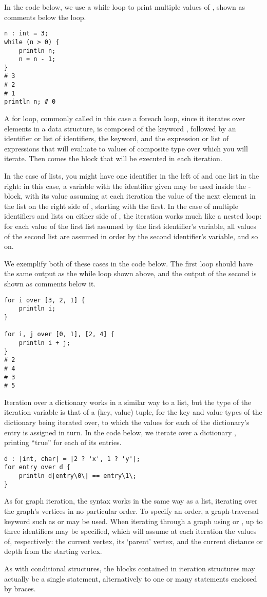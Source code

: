 In the code below, we use a while loop to print multiple values of , shown as comments below the loop.
\begin{lstlisting}[language=Gryph]
n : int = 3;
while (n > 0) {
	println n;
	n = n - 1;
}
# 3
# 2
# 1
println n; # 0
\end{lstlisting}

A for loop, commonly called in this case a foreach loop, since it iterates over elements in a data structure, is composed of the keyword , followed by an identifier or list of identifiers, the  keyword, and the expression or list of expressions that will evaluate to values of composite type over which you will iterate. Then comes the block that will be executed in each iteration.

In the case of lists, you might have one identifier in the left of  and one list in the right: in this case, a variable with the identifier given may be used inside the -block, with its value assuming at each iteration the value of the next element in the list on the right side of , starting with the first. In the case of multiple identifiers and lists on either side of , the iteration works much like a nested loop: for each value of the first list assumed by the first identifier's variable, all values of the second list are assumed in order by the second identifier's variable, and so on.

We exemplify both of these cases in the code below. The first loop should have the same output as the while loop shown above, and the output of the second is shown as comments below it.
\begin{lstlisting}[language=Gryph]
for i over [3, 2, 1] {
	println i;
}

for i, j over [0, 1], [2, 4] {
	println i + j;
}
# 2 
# 4 
# 3 
# 5 
\end{lstlisting}

Iteration over a dictionary works in a similar way to a list, but the type of the iteration variable is that of a (key, value) tuple, for the key and value types of the dictionary being iterated over, to which the values for each of the dictionary's entry is assigned in turn. In the code below, we iterate over a dictionary , printing ``true'' for each of its entries.

\begin{lstlisting}[language=Gryph]
d : |int, char| = |2 ? 'x', 1 ? 'y'|;
for entry over d {
	println d|entry\0\| == entry\1\;
}
\end{lstlisting}

As for graph iteration, the  syntax works in the same way as a list, iterating over the graph's vertices in no particular order. To specify an order, a graph-traversal keyword such as  or  may be used. When iterating through a graph using  or , up to three identifiers may be specified, which will assume at each iteration the values of, respectively: the current vertex, its `parent' vertex, and the current distance or depth from the starting vertex.

As with conditional structures, the blocks contained in iteration structures may actually be a single statement, alternatively to one or many statements enclosed by braces.